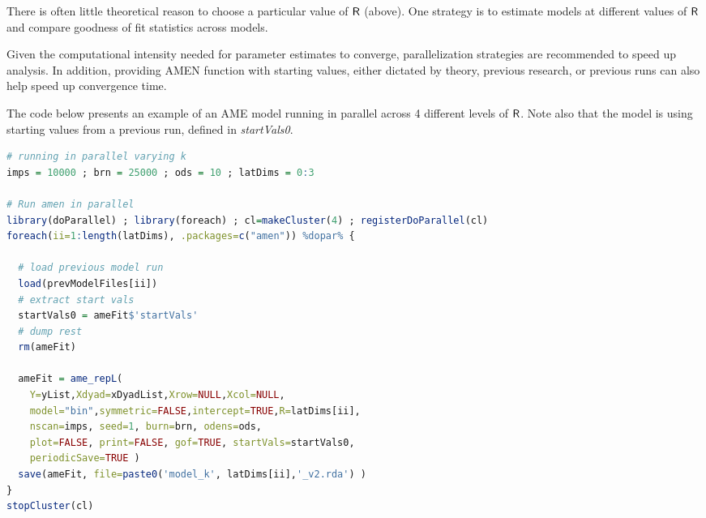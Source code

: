 There is often little theoretical reason to choose a particular value of $\sf{R}$ (above). One strategy is to estimate models at different values of $\sf{R}$ and compare goodness of fit statistics across models.

Given the computational intensity needed for parameter estimates to converge, parallelization strategies are recommended to speed up analysis. In addition, providing AMEN function with starting values, either dictated by theory, previous research, or previous runs can also help speed up convergence time.

The code below presents an example of an AME model running in parallel across 4 different levels of $\sf{R}$. Note also that the model is using starting values from a previous run, defined in \textit{startVals0}.

\begin{lstlisting}[language=R]
# running in parallel varying k
imps = 10000 ; brn = 25000 ; ods = 10 ; latDims = 0:3

# Run amen in parallel
library(doParallel) ; library(foreach) ; cl=makeCluster(4) ; registerDoParallel(cl)
foreach(ii=1:length(latDims), .packages=c("amen")) %dopar% {

  # load previous model run
  load(prevModelFiles[ii])
  # extract start vals
  startVals0 = ameFit$'startVals'
  # dump rest
  rm(ameFit)

  ameFit = ame_repL(
    Y=yList,Xdyad=xDyadList,Xrow=NULL,Xcol=NULL,
    model="bin",symmetric=FALSE,intercept=TRUE,R=latDims[ii],
    nscan=imps, seed=1, burn=brn, odens=ods,
    plot=FALSE, print=FALSE, gof=TRUE, startVals=startVals0,
    periodicSave=TRUE )
  save(ameFit, file=paste0('model_k', latDims[ii],'_v2.rda') )
}
stopCluster(cl)
\end{lstlisting}

